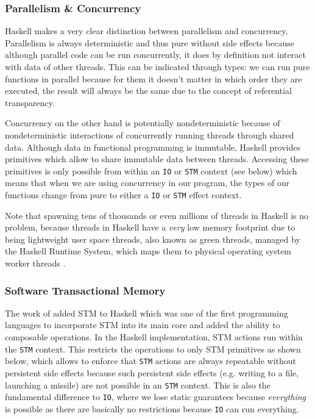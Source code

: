 \subsubsection{Parallelism \& Concurrency}
Haskell makes a very clear distinction between parallelism and concurrency. Parallelism is always deterministic and thus pure without side effects because although parallel code can be run concurrently, it does by definition not interact with data of other threads. This can be indicated through types: we can run pure functions in parallel because for them it doesn't matter in which order they are executed, the result will always be the same due to the concept of referential transparency.

Concurrency on the other hand is potentially nondeterministic because of nondeterministic interactions of concurrently running threads through shared data. Although data in functional programming is immutable, Haskell provides primitives which allow to share immutable data between threads. Accessing these primitives is only possible from within an \texttt{IO} or \texttt{STM} context (see below) which means that when we are using concurrency in our program, the types of our functions change from pure to either a \texttt{IO} or \texttt{STM} effect context.

Note that spawning tens of thousands or even millions of threads in Haskell is no problem, because threads in Haskell have a \textit{very} low memory footprint due to being lightweight user space threads, also known as green threads, managed by the Haskell Runtime System, which maps them to physical operating system worker threads \cite{marlow_runtime_2009}.

\subsubsection{Software Transactional Memory}
The work of \cite{harris_composable_2005, harris_transactional_2006} added STM to Haskell which was one of the first programming languages to incorporate STM into its main core and added the ability to composable operations. %
In the Haskell implementation, STM actions run within the \texttt{STM} context. This restricts the operations to only STM primitives as shown below, which allows to enforce that \texttt{STM} actions are always repeatable without persistent side effects because such persistent side effects (e.g. writing to a file, launching a missile) are not possible in an \texttt{STM} context. This is also the fundamental difference to \texttt{IO}, where we lose static guarantees because \textit{everything} is possible as there are basically no restrictions because \texttt{IO} can run everything.

